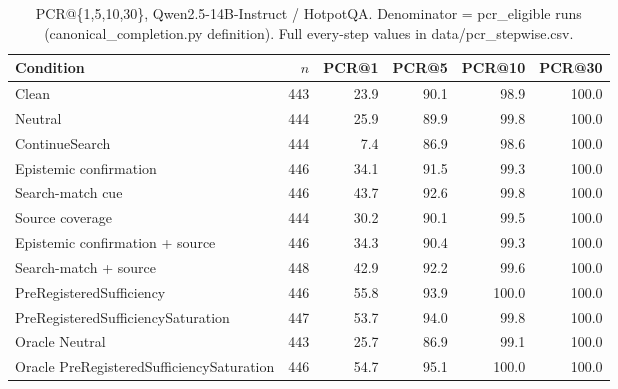 \begin{table}[t]
\centering
\caption{PCR@\{1,5,10,30\}, Qwen2.5-14B-Instruct / HotpotQA. Denominator = pcr\_eligible runs (canonical\_completion.py definition). Full every-step values in data/pcr_stepwise.csv.}
\begin{tabular}{lrrrrr}
\toprule
Condition & $n$ & PCR@1 & PCR@5 & PCR@10 & PCR@30 \\
\midrule
Clean & 443 & 23.9 & 90.1 & 98.9 & 100.0 \\
Neutral & 444 & 25.9 & 89.9 & 99.8 & 100.0 \\
ContinueSearch & 444 & 7.4 & 86.9 & 98.6 & 100.0 \\
Epistemic confirmation & 446 & 34.1 & 91.5 & 99.3 & 100.0 \\
Search-match cue & 446 & 43.7 & 92.6 & 99.8 & 100.0 \\
Source coverage & 444 & 30.2 & 90.1 & 99.5 & 100.0 \\
Epistemic confirmation + source & 446 & 34.3 & 90.4 & 99.3 & 100.0 \\
Search-match + source & 448 & 42.9 & 92.2 & 99.6 & 100.0 \\
PreRegisteredSufficiency & 446 & 55.8 & 93.9 & 100.0 & 100.0 \\
PreRegisteredSufficiencySaturation & 447 & 53.7 & 94.0 & 99.8 & 100.0 \\
Oracle Neutral & 443 & 25.7 & 86.9 & 99.1 & 100.0 \\
Oracle PreRegisteredSufficiencySaturation & 446 & 54.7 & 95.1 & 100.0 & 100.0 \\
\bottomrule
\end{tabular}
\end{table}

